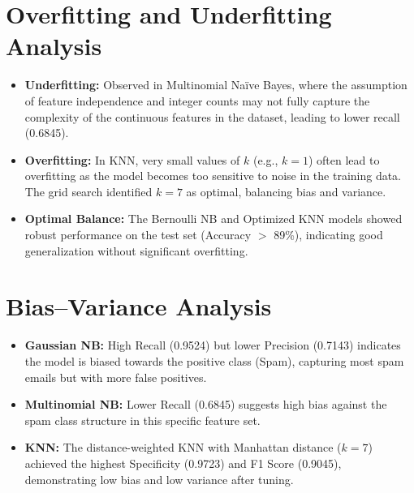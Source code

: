 \documentclass[11pt]{article}
\begin{document}
\section{Overfitting and Underfitting Analysis}
\begin{itemize}
    \item \textbf{Underfitting:} Observed in Multinomial Naïve Bayes, where the assumption of feature independence and integer counts may not fully capture the complexity of the continuous features in the dataset, leading to lower recall (0.6845).
    \item \textbf{Overfitting:} In KNN, very small values of $k$ (e.g., $k=1$) often lead to overfitting as the model becomes too sensitive to noise in the training data. The grid search identified $k=7$ as optimal, balancing bias and variance.
    \item \textbf{Optimal Balance:} The Bernoulli NB and Optimized KNN models showed robust performance on the test set (Accuracy $>$ 89\%), indicating good generalization without significant overfitting.
\end{itemize}

\section{Bias--Variance Analysis}
\begin{itemize}
    \item \textbf{Gaussian NB:} High Recall (0.9524) but lower Precision (0.7143) indicates the model is biased towards the positive class (Spam), capturing most spam emails but with more false positives.
    \item \textbf{Multinomial NB:} Lower Recall (0.6845) suggests high bias against the spam class structure in this specific feature set.
    \item \textbf{KNN:} The distance-weighted KNN with Manhattan distance ($k=7$) achieved the highest Specificity (0.9723) and F1 Score (0.9045), demonstrating low bias and low variance after tuning.
\end{itemize}

\end{document}
